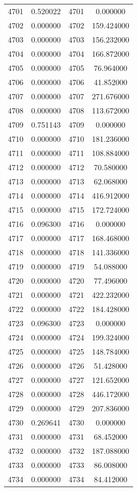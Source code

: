 \documentclass[12pt]{article}
\begin{document}
\begin{longtable}{@{}cccc@{}}
4701 & 0.520022 & 4701 & 0.000000 \\
4702 & 0.000000 & 4702 & 159.424000 \\
4703 & 0.000000 & 4703 & 156.232000 \\
4704 & 0.000000 & 4704 & 166.872000 \\
4705 & 0.000000 & 4705 & 76.964000 \\
4706 & 0.000000 & 4706 & 41.852000 \\
4707 & 0.000000 & 4707 & 271.676000 \\
4708 & 0.000000 & 4708 & 113.672000 \\
4709 & 0.751143 & 4709 & 0.000000 \\
4710 & 0.000000 & 4710 & 181.236000 \\
4711 & 0.000000 & 4711 & 108.884000 \\
4712 & 0.000000 & 4712 & 70.580000 \\
4713 & 0.000000 & 4713 & 62.068000 \\
4714 & 0.000000 & 4714 & 416.912000 \\
4715 & 0.000000 & 4715 & 172.724000 \\
4716 & 0.096300 & 4716 & 0.000000 \\
4717 & 0.000000 & 4717 & 168.468000 \\
4718 & 0.000000 & 4718 & 141.336000 \\
4719 & 0.000000 & 4719 & 54.088000 \\
4720 & 0.000000 & 4720 & 77.496000 \\
4721 & 0.000000 & 4721 & 422.232000 \\
4722 & 0.000000 & 4722 & 184.428000 \\
4723 & 0.096300 & 4723 & 0.000000 \\
4724 & 0.000000 & 4724 & 199.324000 \\
4725 & 0.000000 & 4725 & 148.784000 \\
4726 & 0.000000 & 4726 & 51.428000 \\
4727 & 0.000000 & 4727 & 121.652000 \\
4728 & 0.000000 & 4728 & 446.172000 \\
4729 & 0.000000 & 4729 & 207.836000 \\
4730 & 0.269641 & 4730 & 0.000000 \\
4731 & 0.000000 & 4731 & 68.452000 \\
4732 & 0.000000 & 4732 & 187.088000 \\
4733 & 0.000000 & 4733 & 86.008000 \\
4734 & 0.000000 & 4734 & 84.412000 \\

\end{longtable}
\end{document}
